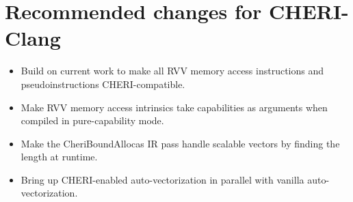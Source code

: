 \section{Recommended changes for CHERI-Clang}\label{chap:software:sec:chericlangchanges}
\begin{itemize}
    \item Build on current work to make all RVV memory access instructions and pseudoinstructions CHERI-compatible.
    \item Make RVV memory access intrinsics take capabilities as arguments when compiled in pure-capability mode.
    \item Make the CheriBoundAllocas IR pass handle scalable vectors by finding the length at runtime.
    \item Bring up CHERI-enabled auto-vectorization in parallel with vanilla auto-vectorization.
\end{itemize}
